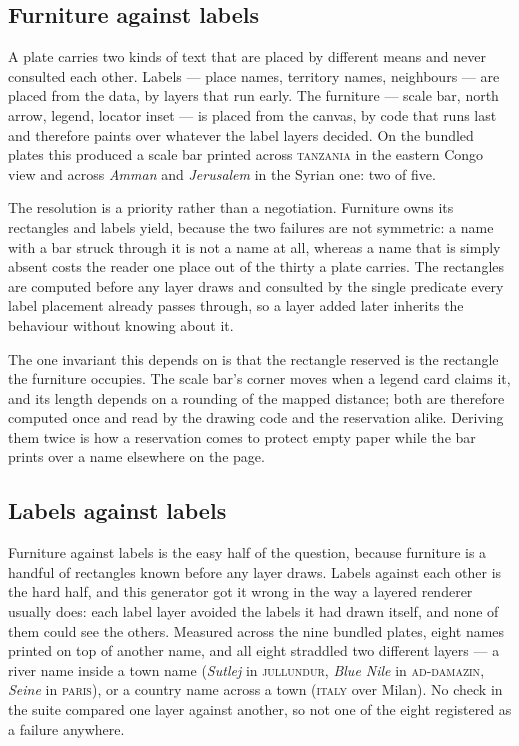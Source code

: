 \documentclass[11pt]{article}
\begin{document}
\subsection{Furniture against labels}

A plate carries two kinds of text that are placed by different means and
never consulted each other. Labels --- place names, territory names,
neighbours --- are placed from the data, by layers that run early. The
furniture --- scale bar, north arrow, legend, locator inset --- is placed
from the canvas, by code that runs last and therefore paints over whatever
the label layers decided. On the bundled plates this produced a scale bar
printed across \textsc{tanzania} in the eastern Congo view and across
\emph{Amman} and \emph{Jerusalem} in the Syrian one: two of five.

The resolution is a priority rather than a negotiation. Furniture owns its
rectangles and labels yield, because the two failures are not symmetric: a
name with a bar struck through it is not a name at all, whereas a name that
is simply absent costs the reader one place out of the thirty a plate
carries. The rectangles are computed before any layer draws and consulted
by the single predicate every label placement already passes through, so a
layer added later inherits the behaviour without knowing about it.

The one invariant this depends on is that the rectangle reserved is the
rectangle the furniture occupies. The scale bar's corner moves when a
legend card claims it, and its length depends on a rounding of the mapped
distance; both are therefore computed once and read by the drawing code and
the reservation alike. Deriving them twice is how a reservation comes to
protect empty paper while the bar prints over a name elsewhere on the page.

\subsection{Labels against labels}
\label{sec:label-ledger}

Furniture against labels is the easy half of the question, because
furniture is a handful of rectangles known before any layer draws. Labels
against each other is the hard half, and this generator got it wrong in
the way a layered renderer usually does: each label layer avoided the
labels it had drawn itself, and none of them could see the others.
Measured across the nine bundled plates, eight names printed on top of
another name, and all eight straddled two different layers --- a river
name inside a town name (\emph{Sutlej} in \textsc{jullundur},
\emph{Blue Nile} in \textsc{ad-damazin}, \emph{Seine} in \textsc{paris}),
or a country name across a town (\textsc{italy} over Milan). No check in
the suite compared one layer against another, so not one of the eight
registered as a failure anywhere.
\end{document}
